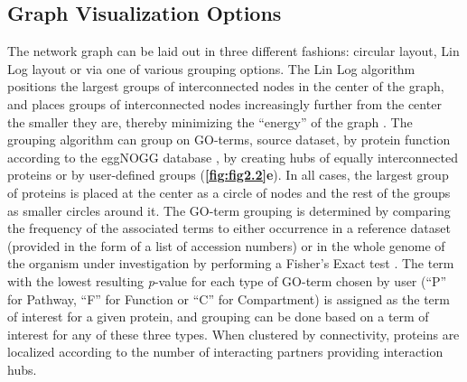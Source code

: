 \subsection{Graph Visualization Options}
The network graph can be laid out in three different fashions: circular layout, Lin Log layout \cite{noack2007energy} or via one of various grouping options. The Lin Log algorithm positions the largest groups of interconnected nodes in the center of the graph, and places groups of interconnected nodes increasingly further from the center the smaller they are, thereby minimizing the “energy” of the graph \cite{pajntar1900overview}. The grouping algorithm can group on GO-terms, source dataset, by protein function according to the eggNOGG database \cite{huerta-cepas2016eggnog}, by creating hubs of equally interconnected proteins or by user-defined groups (\textbf{\autoref{fig:fig2.2}e}). In all cases, the largest group of proteins is placed at the center as a circle of nodes and the rest of the groups as smaller circles around it. The GO-term grouping is determined by comparing the frequency of the associated terms to either occurrence in a reference dataset (provided in the form of a list of accession numbers) or in the whole genome of the organism under investigation by performing a Fisher’s Exact test \cite{rivals2007enrichment}. The term with the lowest resulting \emph{p}-value for each type of GO-term chosen by user (“P” for Pathway, “F” for Function or “C” for Compartment) is assigned as the term of interest for a given protein, and grouping can be done based on a term of interest for any of these three types. When clustered by connectivity, proteins are localized according to the number of interacting partners providing interaction hubs.
